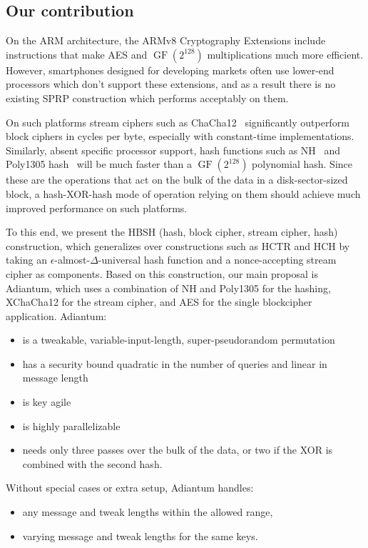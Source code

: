 \documentclass[journal=tosc,preprint,floatrow,submission]{iacrtrans}
\DeclareMathOperator{\GF}{GF}
\begin{document}
\subsection{Our contribution}
On the ARM architecture, the ARMv8 Cryptography Extensions include instructions that make
AES and $\GF(2^{128})$ multiplications much more efficient. However,
smartphones designed for developing markets
often use lower-end processors which
don't support these extensions, and as a result there is no existing SPRP construction which performs
acceptably on them.

On such platforms stream ciphers such as ChaCha12~\cite{chacha} significantly
outperform block ciphers in cycles per byte, especially with constant-time implementations.
Similarly, absent specific processor support, hash functions such as NH~\cite{nh} and
Poly1305 hash~\cite{poly1305} will be much faster
than a $\GF(2^{128})$ polynomial hash. Since these are the operations that act on the bulk of
the data in a disk-sector-sized block, a hash-XOR-hash
mode of operation relying on them should achieve
much improved performance on such platforms.

To this end, we present the HBSH (hash, block cipher, stream cipher, hash)
construction, which generalizes over constructions such as
HCTR and HCH by taking an $\epsilon$-almost-$\Delta$-universal hash function and a
nonce-accepting stream cipher
as components. Based on this construction, our main proposal is Adiantum,
which uses a combination of NH and Poly1305 for the hashing, XChaCha12 for the stream cipher, and
AES for the single blockcipher application. Adiantum:
\begin{itemize}
    \item is a tweakable, variable-input-length, super-pseudorandom permutation
    \item has a security bound quadratic in the number of queries and linear in message length
    \item is key agile
    \item is highly parallelizable
    \item needs only three passes over the bulk of the data, or
        two if the XOR is combined with the second hash.
\end{itemize}

Without special cases or extra setup, Adiantum handles:
\begin{itemize}
    \item any message and tweak lengths within the allowed range,
    \item varying message and tweak lengths for the same keys.
\end{itemize}
\end{document}
